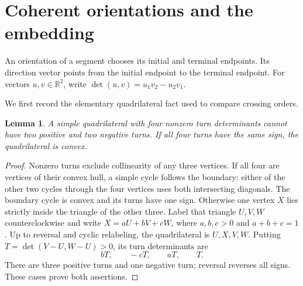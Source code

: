 \documentclass[11pt]{article}
\newtheorem{lemma}[theorem]{Lemma}
\newcommand{\R}{\mathbb R}
\newcommand{\detv}[2]{\det(#1,#2)}
\begin{document}
\section{Coherent orientations and the embedding}

An orientation of a segment chooses its initial and terminal endpoints.
Its direction vector points from the initial endpoint to the terminal
endpoint. For vectors \(u,v\in\R^2\), write
\(\detv{u}{v}=u_1v_2-u_2v_1\).

We first record the elementary quadrilateral fact used to compare
crossing orders.
\begin{lemma}\label{lem:turns}
A simple quadrilateral with four nonzero turn determinants cannot have
two positive and two negative turns. If all four turns have the same
sign, the quadrilateral is convex.
\end{lemma}
\begin{proof}
Nonzero turns exclude collinearity of any three vertices. If all four
are vertices of their convex hull, a simple cycle follows the boundary:
either of the other two cycles through the four vertices uses both intersecting
diagonals. The boundary cycle is convex and its turns have one sign.
Otherwise one vertex \(X\) lies strictly inside the triangle of the
other three. Label that triangle \(U,V,W\) counterclockwise and write
\(X=aU+bV+cW\), where \(a,b,c>0\) and \(a+b+c=1\).
Up to reversal and cyclic relabeling, the quadrilateral is \(U,X,V,W\).
Putting \(T=\detv{V-U}{W-U}>0\), its turn determinants are
\[
 bT,\qquad -cT,\qquad aT,\qquad T.
\]
There are three positive turns and one negative turn; reversal reverses
all signs. These cases prove both assertions.
\end{proof}
\end{document}
